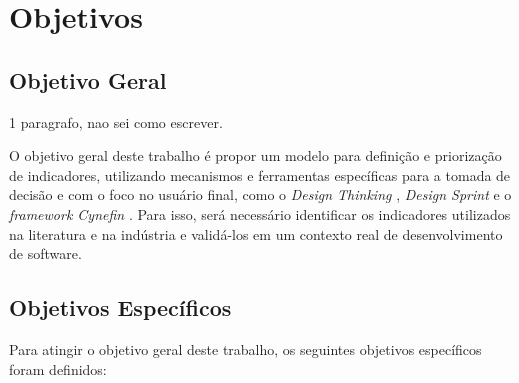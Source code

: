 \section{Objetivos}%

\subsection{Objetivo Geral} 

1 paragrafo, nao sei como escrever. 

O objetivo geral deste trabalho é propor um modelo para definição e priorização de indicadores, utilizando mecanismos e ferramentas específicas para a tomada de decisão e com o foco no usuário final, como o \textit{Design Thinking} \cite{liedtka2018exploring}, \textit{Design Sprint} \cite{ferreira2019using} e o \textit{framework Cynefin} \cite{shalbafan2018decision}. Para isso, será necessário identificar os indicadores utilizados na literatura e na indústria e validá-los em um contexto real de desenvolvimento de software.

\subsection{Objetivos Específicos}
\label{obj}

Para atingir o objetivo geral deste trabalho,  os seguintes objetivos específicos foram definidos:

